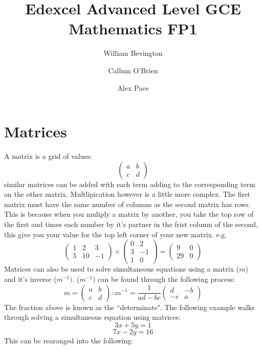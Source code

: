 \documentclass{article}
\title{Edexcel Advanced Level GCE Mathematics FP1}
\author{William Bevington \and Callum O'Brien \and Alex Pace}
\date{}
\begin{document}
\maketitle
\tableofcontents
\newpage

\section{Matrices}
                A matrix is a grid of values:
                \[\left(\begin{array}{cc} a & b \\ c & d \end{array}\right)\]
                similar matrices can be added with each term adding to the corresponding term on the other matrix. Multlipication however is a little more complex. The first matrix must have the same number of columns as the second matrix has rows. This is because when you muliply a matrix by another, you take the top row of the first and times each number by it's partner in the frist column of the second, this give you your value for the top left corner of your new matrix. e.g.
                \[\left(\begin{array}{ccc} 1 & 2 & 3 \\ 5 & 10 & -1 \end{array}\right) \times \left(\begin{array}{cc} 0 & 2 \\ 3 & -1 \\ 1 & 0 \end{array}\right) = \left(\begin{array}{cc} 9 & 0 \\ 29 & 0 \end{array}\right)\]
                Matrices can also be used to solve simultaneous equations using a matrix (\(m\)) and it's inverse (\(m^{-1})\). (\(m^{-1})\) can be found through the following process:
                \[m=\left(\begin{array}{cc} a & b \\ c & d \end{array}\right) \therefore m^{-1} = \frac{1}{ad-bc}\left(\begin{array}{cc} d & -b \\ -c & a \end{array}\right)\]
                The fraction above is known as the ``determinate". The following example walks through solving a simultaneous equation using matrices:
                \[3x+5y=1\]
                \[7x-2y=16\]
                This can be rearanged into the following:
\end{document}
